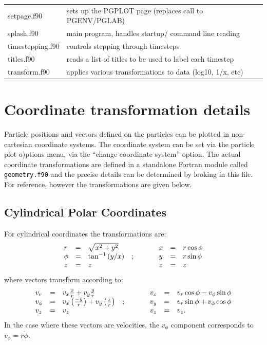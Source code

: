 \documentclass[a4paper,10pt]{article}
\begin{document}
\begin{longtable}{|lp{}|}
     setpage.f90            & sets up the PGPLOT page (replaces call to PGENV/PGLAB)\\
     splash.f90	 & main program, handles startup/ command line reading\\
     timestepping.f90       & controls stepping through timesteps\\
     titles.f90        & reads a list of titles to be used to label each timestep\\
     transform.f90	 	 & applies various transformations to data (log10, 1/x, etc) \\
\end{longtable}

\section{Coordinate transformation details}%
\label{sec:coordtransforms}
Particle positions and vectors defined on the particles can be plotted in non-cartesian coordinate
systems. The coordinate system can be set via the particle plot o)ptions menu, via the ``change coordinate
system'' option. The actual coordinate transformations are defined in a standalone Fortran module called
\verb+geometry.f90+ and the precise details can be determined by looking in this file. For reference, however the transformations are given below.

\subsection{ Cylindrical Polar Coordinates}
For cylindrical coordinates the transformations are:
\begin{displaymath}
\begin{array}{lclp{1cm}lcl}
r & = & \sqrt{x^2 + y^2}    & & x & = & r\cos\phi \\
\phi & = & \tan^{-1}{(y/x)} &; & y & = & r\sin\phi \\
z & = & z                             & & z & = & z\\
\end{array}
\end{displaymath}
where vectors transform according to:
\begin{displaymath}
\begin{array}{lclp{1cm}lcl}
v_r      & = & v_x \frac{x}{r} + v_y \frac{y}{r}  & & v_x & = & v_r \cos\phi - v_\phi \sin\phi \\
v_\phi & = & v_x \left(\frac{-y}{r}\right) + v_y \left(\frac{x}{r}\right) &; &v_y & = & v_r \sin\phi + v_\phi \cos\phi \\
v_z      & = & v_z & & v_z & = & v_z. \\
\end{array}
\end{displaymath}
In the case where these vectors are velocities, the $v_{\phi}$ component corresponds to $v_{\phi} = r\dot{\phi}$.
\end{document}
